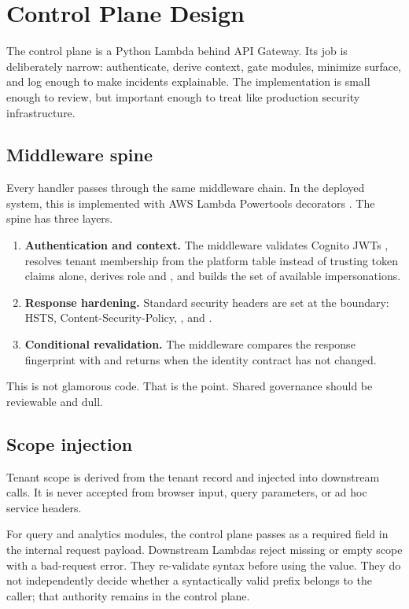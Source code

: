 \section{Control Plane Design}
\label{sec:control-plane}

The control plane is a Python Lambda behind API Gateway. Its job is deliberately narrow: authenticate, derive context, gate modules, minimize surface, and log enough to make incidents explainable. The implementation is small enough to review, but important enough to treat like production security infrastructure.

\subsection{Middleware spine}

Every handler passes through the same middleware chain. In the deployed system, this is implemented with AWS Lambda Powertools decorators \cite{aws_powertools}. The spine has three layers.

\begin{enumerate}
  \item \textbf{Authentication and context.} The middleware validates Cognito JWTs \cite{aws_cognito_user_pools}, resolves tenant membership from the platform table instead of trusting token claims alone, derives role and \scopeprefix{}, and builds the set of available impersonations.
  \item \textbf{Response hardening.} Standard security headers are set at the boundary: HSTS, Content-Security-Policy, , and .
  \item \textbf{Conditional revalidation.} The middleware compares the response fingerprint with  and returns  when the identity contract has not changed.
\end{enumerate}

This is not glamorous code. That is the point. Shared governance should be reviewable and dull.

\subsection{Scope injection}

Tenant scope is derived from the tenant record and injected into downstream calls. It is never accepted from browser input, query parameters, or ad hoc service headers.

For query and analytics modules, the control plane passes \scopeprefix{} as a required field in the internal request payload. Downstream Lambdas reject missing or empty scope with a bad-request error. They re-validate syntax before using the value. They do not independently decide whether a syntactically valid prefix belongs to the caller; that authority remains in the control plane.

